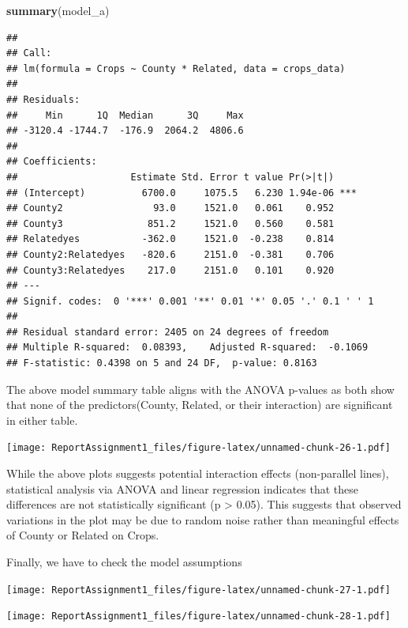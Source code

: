 \documentclass[
  11pt,
]{article}
\newenvironment{Shaded}{\begin{snugshade}}{\end{snugshade}}
\newcommand{\DecValTok}[1]{\textcolor[rgb]{0.00,0.00,0.81}{#1}}
\newcommand{\FunctionTok}[1]{\textcolor[rgb]{0.13,0.29,0.53}{\textbf{#1}}}
\newcommand{\NormalTok}[1]{#1}
\newcommand{\SpecialCharTok}[1]{\textcolor[rgb]{0.81,0.36,0.00}{\textbf{#1}}}
\begin{document}
\begin{Shaded}
\begin{Highlighting}[]
\FunctionTok{summary}\NormalTok{(model\_a)}
\end{Highlighting}
\end{Shaded}

\begin{verbatim}
## 
## Call:
## lm(formula = Crops ~ County * Related, data = crops_data)
## 
## Residuals:
##     Min      1Q  Median      3Q     Max 
## -3120.4 -1744.7  -176.9  2064.2  4806.6 
## 
## Coefficients:
##                    Estimate Std. Error t value Pr(>|t|)    
## (Intercept)          6700.0     1075.5   6.230 1.94e-06 ***
## County2                93.0     1521.0   0.061    0.952    
## County3               851.2     1521.0   0.560    0.581    
## Relatedyes           -362.0     1521.0  -0.238    0.814    
## County2:Relatedyes   -820.6     2151.0  -0.381    0.706    
## County3:Relatedyes    217.0     2151.0   0.101    0.920    
## ---
## Signif. codes:  0 '***' 0.001 '**' 0.01 '*' 0.05 '.' 0.1 ' ' 1
## 
## Residual standard error: 2405 on 24 degrees of freedom
## Multiple R-squared:  0.08393,    Adjusted R-squared:  -0.1069 
## F-statistic: 0.4398 on 5 and 24 DF,  p-value: 0.8163
\end{verbatim}

The above model summary table aligns with the ANOVA p-values as both
show that none of the predictors(County, Related, or their interaction)
are significant in either table.

\texttt{[image: ReportAssignment1\_files/figure-latex/unnamed-chunk-26-1.pdf]}

While the above plots suggests potential interaction effects
(non-parallel lines), statistical analysis via ANOVA and linear
regression indicates that these differences are not statistically
significant (p \textgreater{} 0.05). This suggests that observed
variations in the plot may be due to random noise rather than meaningful
effects of County or Related on Crops.

Finally, we have to check the model assumptions

\texttt{[image: ReportAssignment1\_files/figure-latex/unnamed-chunk-27-1.pdf]}

\texttt{[image: ReportAssignment1\_files/figure-latex/unnamed-chunk-28-1.pdf]}

\begin{Shaded}
\end{Shaded}
\end{document}
